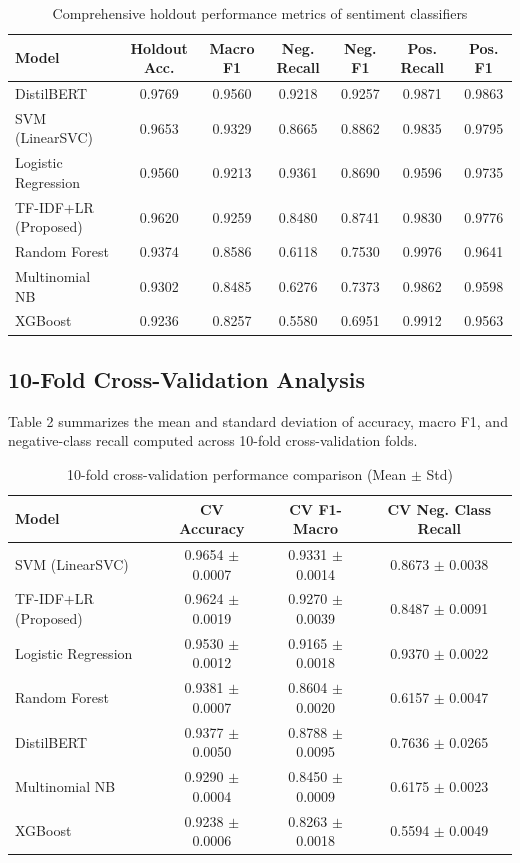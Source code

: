 \documentclass[11pt]{article}
\begin{document}
\begin{table}[H]
\centering
\small
\caption{Comprehensive holdout performance metrics of sentiment classifiers}
\begin{tabular}{lcccccc}
\toprule
\textbf{Model} & \textbf{Holdout Acc.} & \textbf{Macro F1} & \textbf{Neg. Recall} & \textbf{Neg. F1} & \textbf{Pos. Recall} & \textbf{Pos. F1} \\ 
\midrule
DistilBERT & 0.9769 & 0.9560 & 0.9218 & 0.9257 & 0.9871 & 0.9863 \\
SVM (LinearSVC) & 0.9653 & 0.9329 & 0.8665 & 0.8862 & 0.9835 & 0.9795 \\
Logistic Regression & 0.9560 & 0.9213 & 0.9361 & 0.8690 & 0.9596 & 0.9735 \\
TF-IDF+LR (Proposed) & 0.9620 & 0.9259 & 0.8480 & 0.8741 & 0.9830 & 0.9776 \\
Random Forest & 0.9374 & 0.8586 & 0.6118 & 0.7530 & 0.9976 & 0.9641 \\
Multinomial NB & 0.9302 & 0.8485 & 0.6276 & 0.7373 & 0.9862 & 0.9598 \\
XGBoost & 0.9236 & 0.8257 & 0.5580 & 0.6951 & 0.9912 & 0.9563 \\
\bottomrule
\end{tabular}
\end{table}


\subsection{10-Fold Cross-Validation Analysis}
Table 2 summarizes the mean and standard deviation of accuracy, macro F1, and negative-class recall computed across 10-fold cross-validation folds.

\begin{table}[H]
\centering
\small
\caption{10-fold cross-validation performance comparison (Mean $\pm$ Std)}
\begin{tabular}{lccc}
\toprule
\textbf{Model} & \textbf{CV Accuracy} & \textbf{CV F1-Macro} & \textbf{CV Neg. Class Recall} \\ 
\midrule
SVM (LinearSVC) & 0.9654 $\pm$ 0.0007 & 0.9331 $\pm$ 0.0014 & 0.8673 $\pm$ 0.0038 \\
TF-IDF+LR (Proposed) & 0.9624 $\pm$ 0.0019 & 0.9270 $\pm$ 0.0039 & 0.8487 $\pm$ 0.0091 \\
Logistic Regression & 0.9530 $\pm$ 0.0012 & 0.9165 $\pm$ 0.0018 & 0.9370 $\pm$ 0.0022 \\
Random Forest & 0.9381 $\pm$ 0.0007 & 0.8604 $\pm$ 0.0020 & 0.6157 $\pm$ 0.0047 \\
DistilBERT & 0.9377 $\pm$ 0.0050 & 0.8788 $\pm$ 0.0095 & 0.7636 $\pm$ 0.0265 \\
Multinomial NB & 0.9290 $\pm$ 0.0004 & 0.8450 $\pm$ 0.0009 & 0.6175 $\pm$ 0.0023 \\
XGBoost & 0.9238 $\pm$ 0.0006 & 0.8263 $\pm$ 0.0018 & 0.5594 $\pm$ 0.0049 \\
\bottomrule
\end{tabular}
\end{table}
\end{document}
